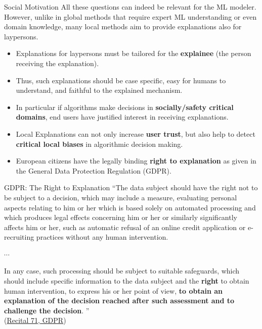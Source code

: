 \documentclass[11pt,compress,t,notes=noshow, xcolor=table]{beamer}
\begin{document}
\begin{vbframe}{Social Motivation}
All these questions can indeed be relevant for the ML modeler. However, unlike in global methods that require expert ML understanding or even domain knowledge, many local methods aim to provide explanations also for laypersons. 
	\begin{itemize}
		\item Explanations for laypersons must be tailored for the \textbf{explainee} (the person receiving the explanation).
		\item Thus, such explanations should be case specific, easy for humans to understand, and faithful to the explained mechanism.
		\item In particular if algorithms make decisions in \textbf{socially/safety critical domains}, end users have justified interest in receiving explanations.
		\item Local Explanations can not only increase \textbf{user trust}, but also help to detect \textbf{critical local biases} in algorithmic decision making.
		\item European citizens have the legally binding \textbf{right to explanation} as given in the General Data Protection Regulation (GDPR).

	\end{itemize}
\end{vbframe}


\begin{vbframe}{GDPR: The Right to Explanation}
    ``The data subject should have the right not to be subject to a decision, which may include a measure, evaluating personal aspects relating to him or her which is based solely on automated processing and which produces legal effects concerning him or her or similarly significantly affects him or her, such as automatic refusal of an online credit application or e-recruiting practices without any human intervention.

$\cdots$

In any case, such processing should be subject to suitable safeguards, which should include specific information to the data subject and the \textbf{right} to obtain human intervention, to express his or her point of view, \textbf{to obtain an explanation of the decision reached after such assessment and to challenge the decision}.
'' \\[0.2cm] (\href{https://gdpr-text.com/read/recital-71/}{Recital 71, GDPR})
\end{vbframe}
\end{document}
